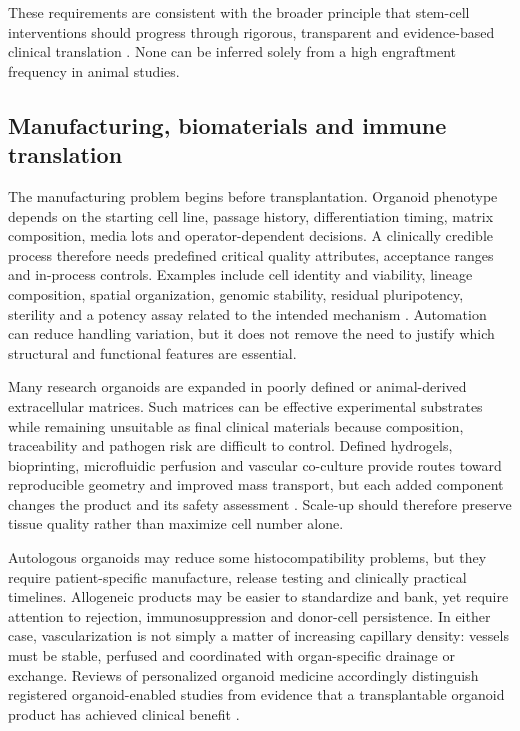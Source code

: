 \documentclass[11pt,a4paper]{article}
\begin{document}
These requirements are consistent with the broader principle that stem-cell interventions should progress through rigorous, transparent and evidence-based clinical translation \citep{lovellbadge2021}. None can be inferred solely from a high engraftment frequency in animal studies.

\subsection{Manufacturing, biomaterials and immune translation}

The manufacturing problem begins before transplantation. Organoid phenotype depends on the starting cell line, passage history, differentiation timing, matrix composition, media lots and operator-dependent decisions. A clinically credible process therefore needs predefined critical quality attributes, acceptance ranges and in-process controls. Examples include cell identity and viability, lineage composition, spatial organization, genomic stability, residual pluripotency, sterility and a potency assay related to the intended mechanism \citep{rossi2018,hofer2021,jensen2023}. Automation can reduce handling variation, but it does not remove the need to justify which structural and functional features are essential.

Many research organoids are expanded in poorly defined or animal-derived extracellular matrices. Such matrices can be effective experimental substrates while remaining unsuitable as final clinical materials because composition, traceability and pathogen risk are difficult to control. Defined hydrogels, bioprinting, microfluidic perfusion and vascular co-culture provide routes toward reproducible geometry and improved mass transport, but each added component changes the product and its safety assessment \citep{brassard2019,park2024}. Scale-up should therefore preserve tissue quality rather than maximize cell number alone.

Autologous organoids may reduce some histocompatibility problems, but they require patient-specific manufacture, release testing and clinically practical timelines. Allogeneic products may be easier to standardize and bank, yet require attention to rejection, immunosuppression and donor-cell persistence. In either case, vascularization is not simply a matter of increasing capillary density: vessels must be stable, perfused and coordinated with organ-specific drainage or exchange. Reviews of personalized organoid medicine accordingly distinguish registered organoid-enabled studies from evidence that a transplantable organoid product has achieved clinical benefit \citep{sotogamez2024,septiana2024}.
\end{document}
